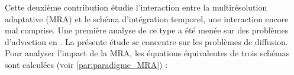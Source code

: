 Cette deuxième contribution étudie l'interaction entre la multirésolution adaptative (MRA) et le schéma d'intégration temporel, 
une interaction encore mal comprise. 
Une première analyse de ce type a été menée sur des problèmes d'advection en \cite{belloti_et_al_2025,Massot2025_meshAdaptation}. 
La présente étude se concentre sur les problèmes de diffusion. 
Pour analyser l'impact de la MRA, les équations équivalentes de trois schémas sont calculées (voir \ref{par:paradigme_MRA}) :

